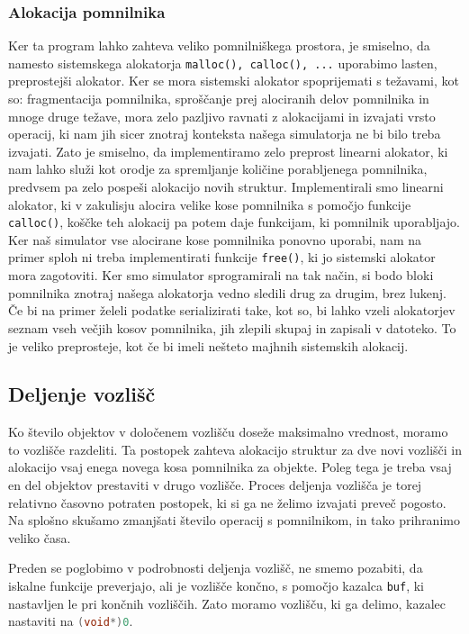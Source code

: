 \documentclass[a4paper,12pt]{article}
\begin{document}
\subsubsection{Alokacija pomnilnika}
Ker ta program lahko zahteva veliko pomnilniškega prostora, je smiselno, da namesto sistemskega
alokatorja \lstinline|malloc(), calloc(), ...| uporabimo lasten, preprostejši alokator.
Ker se mora sistemski alokator spoprijemati s težavami, kot so: fragmentacija pomnilnika, sproščanje
prej alociranih delov pomnilnika in mnoge druge težave, mora zelo pazljivo ravnati z alokacijami in
izvajati vrsto operacij, ki nam jih sicer znotraj konteksta našega simulatorja
ne bi bilo treba izvajati. Zato je smiselno, da implementiramo zelo preprost linearni alokator, ki nam lahko služi kot orodje
za spremljanje količine porabljenega pomnilnika, predvsem pa zelo pospeši alokacijo novih struktur.
Implementirali smo linearni alokator, ki v zakulisju alocira velike kose pomnilnika s pomočjo
funkcije \lstinline|calloc()|, koščke teh alokacij pa potem daje funkcijam, ki pomnilnik uporabljajo.
Ker naš simulator vse alocirane kose pomnilnika ponovno uporabi, nam na primer sploh ni treba implementirati
funkcije \lstinline|free()|, ki jo sistemski alokator mora zagotoviti. Ker smo simulator sprogramirali na tak način,
si bodo bloki pomnilnika znotraj našega alokatorja vedno sledili drug za drugim, brez lukenj. Če bi na primer želeli
podatke serializirati take, kot so, bi lahko vzeli alokatorjev seznam vseh večjih kosov pomnilnika, jih zlepili
skupaj in zapisali v datoteko. To je veliko preprosteje, kot če bi imeli nešteto majhnih sistemskih alokacij.

\subsection{Deljenje vozlišč}
Ko število objektov v določenem vozlišču doseže maksimalno vrednost, moramo to vozlišče
razdeliti. Ta postopek zahteva alokacijo struktur za dve novi vozlišči in alokacijo vsaj enega novega
kosa pomnilnika za objekte. Poleg tega je treba vsaj en del objektov prestaviti v drugo vozlišče.
Proces deljenja vozlišča je torej relativno časovno potraten postopek, ki si ga ne želimo izvajati
preveč pogosto. Na splošno skušamo zmanjšati število operacij s pomnilnikom, in tako prihranimo veliko
časa.

Preden se poglobimo v podrobnosti deljenja vozlišč, ne smemo pozabiti, da iskalne funkcije preverjajo,
ali je vozlišče končno, s pomočjo kazalca \lstinline|buf|, ki nastavljen le pri končnih vozliščih. 
Zato moramo vozlišču, ki ga delimo, kazalec nastaviti na \lstinline[language=C]|(void*)0|.
\end{document}

